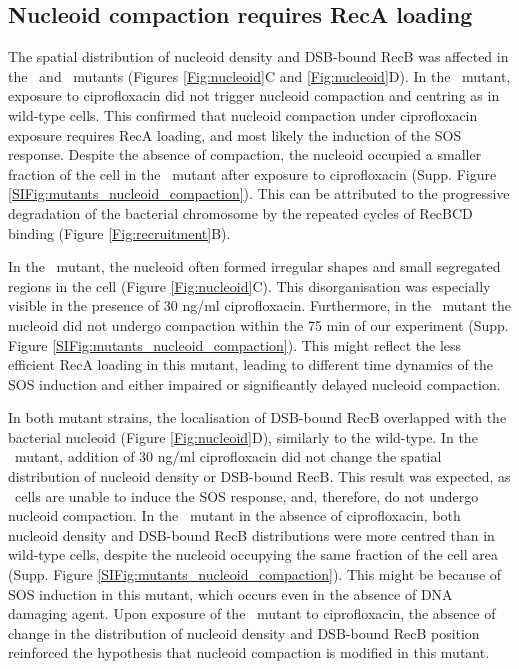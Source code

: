 \subsection*{Nucleoid compaction requires RecA loading}
The spatial distribution of nucleoid density and DSB-bound RecB was affected in the \dreca\ and \geneteneighty\ mutants (Figures \ref{Fig:nucleoid}C and \ref{Fig:nucleoid}D). In the \dreca\ mutant, exposure to ciprofloxacin did not trigger nucleoid compaction and centring as in wild-type cells. This confirmed that nucleoid compaction under ciprofloxacin exposure requires RecA loading, and most likely the induction of the SOS response. Despite the absence of compaction, the nucleoid occupied a smaller fraction of the cell in the \dreca\ mutant after exposure to ciprofloxacin (Supp. Figure \ref{SIFig:mutants_nucleoid_compaction}). This can be attributed to the progressive degradation of the bacterial chromosome by the repeated cycles of RecBCD binding (Figure \ref{Fig:recruitment}B).

In the \geneteneighty\ mutant, the nucleoid often formed irregular shapes and small segregated regions in the cell (Figure \ref{Fig:nucleoid}C). This disorganisation was especially visible in the presence of 30 ng/ml ciprofloxacin. Furthermore, in the \geneteneighty\ mutant the nucleoid did not undergo compaction within the 75 min of our experiment (Supp. Figure \ref{SIFig:mutants_nucleoid_compaction}). This might reflect the less efficient RecA loading in this mutant, leading to different time dynamics of the SOS induction and either impaired or significantly delayed nucleoid compaction.

In both mutant strains, the localisation of DSB-bound RecB overlapped with the bacterial nucleoid (Figure \ref{Fig:nucleoid}D), similarly to the wild-type. In the \dreca\ mutant, addition of 30 ng/ml ciprofloxacin did not change the spatial distribution of nucleoid density or DSB-bound RecB. This result was expected, as \dreca\ cells are unable to induce the SOS response, and, therefore, do not undergo nucleoid compaction. In the \geneteneighty\ mutant in the absence of ciprofloxacin, both nucleoid density and DSB-bound RecB distributions were more centred than in wild-type cells, despite the nucleoid occupying the same fraction of the cell area (Supp. Figure \ref{SIFig:mutants_nucleoid_compaction}). This might be because of SOS induction in this mutant, which occurs even in the absence of DNA damaging agent\cite{Lepore2025}. Upon exposure of the \geneteneighty\ mutant to ciprofloxacin, the absence of change in the distribution of nucleoid density and DSB-bound RecB position reinforced the hypothesis that nucleoid compaction is modified in this mutant.
